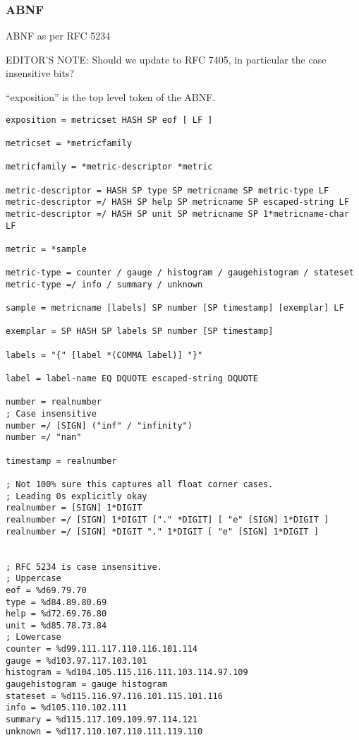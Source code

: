 \documentclass[a4paper,12pt,notitlepage,twoside,openright]{article}
\begin{document}
\hypertarget{abnf}{%
\subsubsection{ABNF}\label{abnf}}

ABNF as per RFC 5234

EDITOR'S NOTE: Should we update to RFC 7405, in particular the case
insensitive bits?

``exposition'' is the top level token of the ABNF.

\begin{verbatim}
exposition = metricset HASH SP eof [ LF ]

metricset = *metricfamily

metricfamily = *metric-descriptor *metric

metric-descriptor = HASH SP type SP metricname SP metric-type LF
metric-descriptor =/ HASH SP help SP metricname SP escaped-string LF
metric-descriptor =/ HASH SP unit SP metricname SP 1*metricname-char LF

metric = *sample

metric-type = counter / gauge / histogram / gaugehistogram / stateset
metric-type =/ info / summary / unknown

sample = metricname [labels] SP number [SP timestamp] [exemplar] LF

exemplar = SP HASH SP labels SP number [SP timestamp]

labels = "{" [label *(COMMA label)] "}"

label = label-name EQ DQUOTE escaped-string DQUOTE

number = realnumber
; Case insensitive
number =/ [SIGN] ("inf" / "infinity")
number =/ "nan"

timestamp = realnumber

; Not 100% sure this captures all float corner cases.
; Leading 0s explicitly okay
realnumber = [SIGN] 1*DIGIT
realnumber =/ [SIGN] 1*DIGIT ["." *DIGIT] [ "e" [SIGN] 1*DIGIT ]
realnumber =/ [SIGN] *DIGIT "." 1*DIGIT [ "e" [SIGN] 1*DIGIT ]


; RFC 5234 is case insensitive.
; Uppercase
eof = %d69.79.70
type = %d84.89.80.69
help = %d72.69.76.80
unit = %d85.78.73.84
; Lowercase
counter = %d99.111.117.110.116.101.114
gauge = %d103.97.117.103.101
histogram = %d104.105.115.116.111.103.114.97.109
gaugehistogram = gauge histogram
stateset = %d115.116.97.116.101.115.101.116
info = %d105.110.102.111
summary = %d115.117.109.109.97.114.121
unknown = %d117.110.107.110.111.119.110


\end{verbatim}
\end{document}
